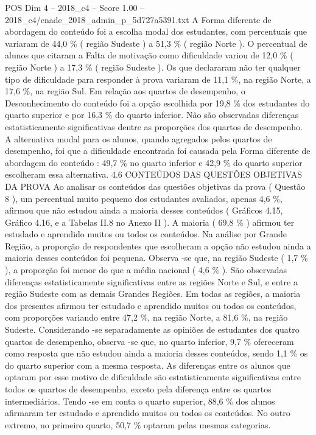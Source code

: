 \begin{textsample}{POS Dim 4 – 2018\_c4 – Score 1.00 – 2018\_c4/enade\_2018\_admin\_p\_5d727a5391.txt}
A Forma diferente de abordagem do conteúdo foi a escolha modal dos estudantes, com percentuais que variaram de 44,0 \% ( região Sudeste ) a 51,3 \% ( região Norte ).
O percentual de alunos que citaram a Falta de motivação como dificuldade variou de 12,0 \% ( região Norte ) a 17,3 \% ( região Sudeste ).
Os que declararam não ter qualquer tipo de dificuldade para responder à prova variaram de 11,1 \%, na região Norte, a 17,6 \%, na região Sul.
Em relação aos quartos de desempenho, o Desconhecimento do conteúdo foi a opção escolhida por 19,8 \% dos estudantes do quarto superior e por 16,3 \% do quarto inferior.
Não são observadas diferenças estatisticamente significativas dentre as proporções dos quartos de desempenho.
A alternativa modal para os alunos, quando agregados pelos quartos de desempenho, foi que a dificuldade encontrada foi causada pela Forma diferente de abordagem do conteúdo : 49,7 \% no quarto inferior e 42,9 \% do quarto superior escolheram essa alternativa. 4.6 CONTEÚDOS DAS QUESTÕES OBJETIVAS DA PROVA Ao analisar os conteúdos das questões objetivas da prova ( Questão 8 ), um percentual muito pequeno dos estudantes avaliados, apenas 4,6 \%, afirmou que não estudou ainda a maioria desses conteúdos ( Gráficos 4.15, Gráfico 4.16, e a Tabelas II.8 no Anexo II ).
A maioria ( 69,8 \% ) afirmou ter estudado e aprendido muitos ou todos os conteúdos.
Na análise por Grande Região, a proporção de respondentes que escolheram a opção não estudou ainda a maioria desses conteúdos foi pequena.
Observa -se que, na região Sudeste ( 1,7 \% ), a proporção foi menor do que a média nacional ( 4,6 \% ).
São observadas diferenças estatisticamente significativas entre as regiões Norte e Sul, e entre a região Sudeste com as demais Grandes Regiões.
Em todas as regiões, a maioria dos presentes afirmou ter estudado e aprendido muitos ou todos os conteúdos, com proporções variando entre 47,2 \%, na região Norte, a 81,6 \%, na região Sudeste.
Considerando -se separadamente as opiniões de estudantes dos quatro quartos de desempenho, observa -se que, no quarto inferior, 9,7 \% ofereceram como resposta que não estudou ainda a maioria desses conteúdos, sendo 1,1 \% os do quarto superior com a mesma resposta.
As diferenças entre os alunos que optaram por esse motivo de dificuldade são estatisticamente significativas entre todos os quartos de desempenho, exceto pela diferença entre os quartos intermediários.
Tendo -se em conta o quarto superior, 88,6 \% dos alunos afirmaram ter estudado e aprendido muitos ou todos os conteúdos.
No outro extremo, no primeiro quarto, 50,7 \% optaram pelas mesmas categorias.

\end{textsample}

